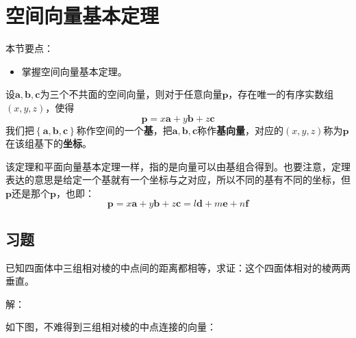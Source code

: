 \section{空间向量基本定理}

本节要点：
\begin{itemize}
    \item 掌握空间向量基本定理。
\end{itemize}

\begin{theorem}[空间向量基本定理]
设$\boldsymbol{a},\boldsymbol{b},\boldsymbol{c}$为三个不共面的空间向量，则对于任意向量$\boldsymbol{p}$，存在唯一的有序实数组$\left( x,y,z \right) $，使得
\[
\boldsymbol{p}=x\boldsymbol{a}+y\boldsymbol{b}+z\boldsymbol{c}
\]
我们把$\left\{ \boldsymbol{a},\boldsymbol{b},\boldsymbol{c} \right\} $称作空间的一个{\bf 基}，把$\boldsymbol{a},\boldsymbol{b},\boldsymbol{c}$称作{\bf 基向量}，对应的$\left( x,y,z \right) $称为$\boldsymbol{p}$在该组基下的{\bf 坐标}。
\end{theorem}

该定理和平面向量基本定理一样，指的是向量可以由基组合得到。也要注意，定理表达的意思是给定一个基就有一个坐标与之对应，所以不同的基有不同的坐标，但$\boldsymbol{p}$还是那个$\boldsymbol{p}$，也即：
\[
\boldsymbol{p}=x\boldsymbol{a}+y\boldsymbol{b}+z\boldsymbol{c}=l\boldsymbol{d}+m\boldsymbol{e}+n\boldsymbol{f}
\]

\subsection{习题}

\begin{example}
已知四面体中三组相对棱的中点间的距离都相等，求证：这个四面体相对的棱两两垂直。
\end{example}

解：

如下图，不难得到三组相对棱的中点连接的向量：

